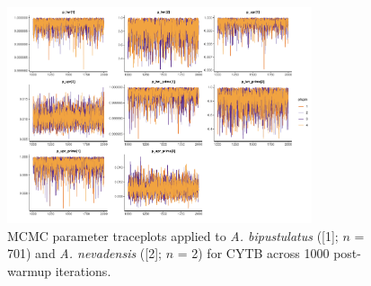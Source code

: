 \documentclass[12pt]{article}
\begin{document}
\newpage

\begin{figure}[H]

\centering

\includegraphics[width=0.80\textwidth]{Figure 2}

\caption{MCMC parameter traceplots applied to \textit{A. bipustulatus} ([1]; $n$ = 701) and \textit{A. nevadensis} ([2]; $n$ = 2) for CYTB across 1000 post-warmup iterations.}

\end{figure}

\newpage
\end{document}
